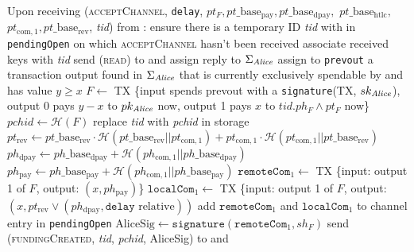\begin{algorithmic}[1]
    \State Upon receiving (\textsc{acceptChannel}, \texttt{delay}, $pt_F,
    pt\_\mathrm{base}_{\mathrm{pay}}, pt\_\mathrm{base}_{\mathrm{dpay}},$
    $pt\_\mathrm{base}_{\mathrm{htlc}},$ $pt_{\mathrm{com}, 1},
    pt\_\mathrm{base}_{\mathrm{rev}}$, \textit{tid}) from \bob:
    \Indent
      \State ensure there is a temporary ID \textit{tid} with \bob{} in
      \texttt{pendingOpen} on which \textsc{acceptChannel} hasn't been received
      \State associate received keys with \textit{tid}
      \State send (\textsc{read}) to \ledger{} and assign reply to
      $\Sigma_{\mathit{Alice}}$
      \State assign to \texttt{prevout} a transaction output found in
      $\Sigma_{\mathit{Alice}}$ that is currently exclusively spendable by \alice{} and
      has value $y \geq x$
      \State $F \gets$ TX \{input spends prevout with a \texttt{signature}(TX,
      $sk_{\mathit{Alice}}$), output 0 pays $y - x$ to $pk_{\mathit{Alice}}$ now, output 1 pays
      $x$ to $\textit{tid}.ph_F \wedge pt_F$ now\}
      \State $\mathit{pchid} \gets \mathcal{H}\left(F\right)$
      \State replace \textit{tid} with \textit{pchid} in storage
      \State $pt_{\mathrm{rev}} \gets pt\_\mathrm{base}_{\mathrm{rev}} \cdot
      \mathcal{H}\left(pt\_\mathrm{base}_{\mathrm{rev}} ||
      pt_{\mathrm{com}, 1}\right) + pt_{\mathrm{com}, 1} \cdot \mathcal{H}\left(
      pt_{\mathrm{com}, 1} || pt\_\mathrm{base}_{\mathrm{rev}}\right)$
      \State $ph_{\mathrm{dpay}} \gets ph\_\mathrm{base}_{\mathrm{dpay}} +
      \mathcal{H}\left(ph_{\mathrm{com}, 1} ||
      ph\_\mathrm{base}_{\mathrm{dpay}}\right)$
      \State $ph_{\mathrm{pay}} \gets ph\_\mathrm{base}_{\mathrm{pay}} +
      \mathcal{H}\left(ph_{\mathrm{com}, 1} ||
      ph\_\mathrm{base}_{\mathrm{pay}}\right)$
      \State $\mathtt{remoteCom}_1 \gets$ TX \{input: output 1 of $F$, output:
      $\left(x, ph_{\mathrm{pay}}\right)$\}
      \State $\mathtt{localCom}_1 \gets$ TX \{input: output 1 of $F$, output:
      $\left(x, pt_{\mathrm{rev}} \vee \left(ph_{\mathrm{dpay}}, \mathtt{delay}
      \text{ relative}\right)\right)$ 
      \State add $\mathtt{remoteCom}_1$ and $\mathtt{localCom}_1$ to channel
      entry in \texttt{pendingOpen}
      \State $\mathrm{AliceSig} \gets
      \mathtt{signature}\left(\mathtt{remoteCom}_1, sh_F\right)$
      \State send (\textsc{fundingCreated}, \textit{tid},
      \textit{pchid}, AliceSig) to \bob{} and \adversary
    \EndIndent
    \State


\end{algorithmic}
